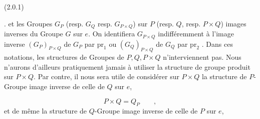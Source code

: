 (2.0.1)  \qquad .
et les Groupes $G_P$ (resp. $G_Q$ resp. $G_{P\times Q}$) sur $P$ (resp. $Q$, resp. $P\times Q$) images inverses du Groupe $G$ sur $e$. On identifiera $G_{P\times Q}$ indifféremment à l'image inverse $(G_P)_{P\times Q}$ de $G_P$ par $\mathrm{pr}_1$ ou $(G_Q)_{P\times Q}$ de $G_Q$ par $\mathrm{pr}_2$ . Dans ces notations, les structures de Groupes de $P,Q,P\times Q$ n'interviennent pas. Nous n'aurons d'ailleurs pratiquement jamais à utiliser la structure de groupe produit sur $P\times Q$. Par contre, il nous sera utile de considérer sur $P\times Q$ la structure de $P$-Groupe image inverse de celle de $Q$ sur $e$,

\begin{equation}\tag{2.0.2}
P\times Q = Q_P \qquad ,
\end{equation}
et de même la structure de $Q$-Groupe image inverse de celle de $P$ sur $e$,

